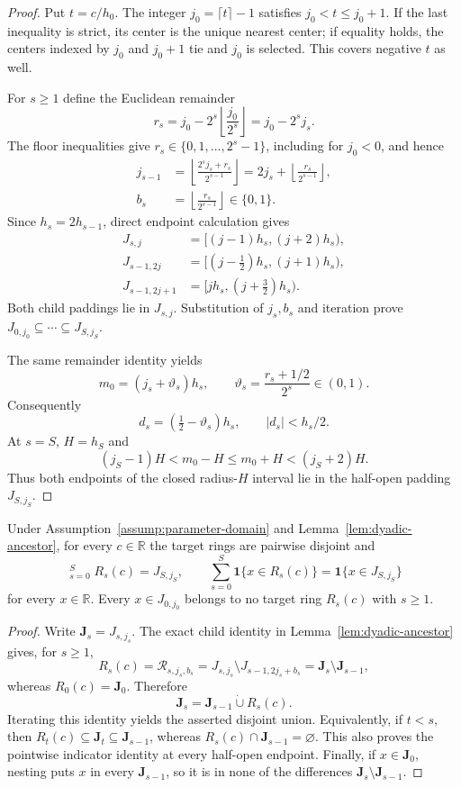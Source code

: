 \begin{proof}
Put $t=c/h_0$.  The integer $j_0=\lceil t\rceil-1$ satisfies
$j_0<t\leq j_0+1$.  If the last inequality is strict, its center is the
unique nearest center; if equality holds, the centers indexed by $j_0$ and
$j_0+1$ tie and $j_0$ is selected.  This covers negative $t$ as well.

For $s\geq1$ define the Euclidean remainder
\[
 r_s=j_0-2^s\left\lfloor\frac{j_0}{2^s}\right\rfloor
     =j_0-2^sj_s.
\]
The floor inequalities give $r_s\in\{0,1,\ldots,2^s-1\}$, including for
$j_0<0$, and hence
\[
\begin{aligned}
 j_{s-1}
 &=\left\lfloor\frac{2^sj_s+r_s}{2^{s-1}}\right\rfloor
 =2j_s+\left\lfloor\frac{r_s}{2^{s-1}}\right\rfloor,\\
 b_s&=\left\lfloor\frac{r_s}{2^{s-1}}\right\rfloor\in\{0,1\}.
\end{aligned}
\]
Since $h_s=2h_{s-1}$, direct endpoint calculation gives
\[
\begin{aligned}
 J_{s,j}&=[(j-1)h_s,(j+2)h_s),\\
 J_{s-1,2j}&=[(j-\tfrac12)h_s,(j+1)h_s),\\
 J_{s-1,2j+1}&=[jh_s,(j+\tfrac32)h_s).
\end{aligned}
\]
Both child paddings lie in $J_{s,j}$.  Substitution of $j_s,b_s$ and
iteration prove
$J_{0,j_0}\subseteq\cdots\subseteq J_{S,j_S}$.

The same remainder identity yields
\[
 m_0=(j_s+\vartheta_s)h_s,\qquad
 \vartheta_s=\frac{r_s+1/2}{2^s}\in(0,1).
\]
Consequently
\[
 d_s=(\tfrac12-\vartheta_s)h_s,\qquad |d_s|<h_s/2.
\]
At $s=S$, $H=h_S$ and
\[
 (j_S-1)H<m_0-H\leq m_0+H<(j_S+2)H.
\]
Thus both endpoints of the closed radius-$H$ interval lie in the half-open
padding $J_{S,j_S}$.
\end{proof}

\begin{proposition}\label{prop:ring-partition}
Under Assumption~\ref{assump:parameter-domain} and
Lemma~\ref{lem:dyadic-ancestor}, for every $c\in\mathbb R$ the target rings
are pairwise disjoint and
\[
 \mathop{\dot\bigcup}_{s=0}^S R_s(c)=J_{S,j_S},
 \qquad
 \sum_{s=0}^S\mathbf1\{x\in R_s(c)\}
 =\mathbf1\{x\in J_{S,j_S}\}
\]
for every $x\in\mathbb R$.  Every $x\in J_{0,j_0}$ belongs to no target
ring $R_s(c)$ with $s\geq1$.
\end{proposition}

\begin{proof}
Write $\mathbf J_s=J_{s,j_s}$.  The exact child identity in
Lemma~\ref{lem:dyadic-ancestor} gives, for $s\geq1$,
\[
 R_s(c)=\mathcal R_{s,j_s,b_s}
 =J_{s,j_s}\setminus J_{s-1,2j_s+b_s}
 =\mathbf J_s\setminus\mathbf J_{s-1},
\]
whereas $R_0(c)=\mathbf J_0$.  Therefore
\[
 \mathbf J_s=\mathbf J_{s-1}\mathbin{\dot\cup}R_s(c).
\]
Iterating this identity yields the asserted disjoint union.  Equivalently,
if $t<s$, then
$R_t(c)\subseteq\mathbf J_t\subseteq\mathbf J_{s-1}$, whereas
$R_s(c)\cap\mathbf J_{s-1}=\varnothing$.  This also proves the pointwise
indicator identity at every half-open endpoint.  Finally, if
$x\in\mathbf J_0$, nesting puts $x$ in every $\mathbf J_{s-1}$, so it is
in none of the differences $\mathbf J_s\setminus\mathbf J_{s-1}$.
\end{proof}

